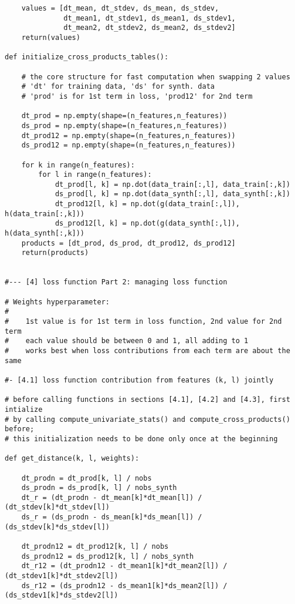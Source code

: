 \documentclass[oneside,10pt]{book}
\begin{document}
\begin{lstlisting}
    values = [dt_mean, dt_stdev, ds_mean, ds_stdev,
              dt_mean1, dt_stdev1, ds_mean1, ds_stdev1,
              dt_mean2, dt_stdev2, ds_mean2, ds_stdev2]
    return(values)

def initialize_cross_products_tables():

    # the core structure for fast computation when swapping 2 values
    # 'dt' for training data, 'ds' for synth. data
    # 'prod' is for 1st term in loss, 'prod12' for 2nd term

    dt_prod = np.empty(shape=(n_features,n_features))
    ds_prod = np.empty(shape=(n_features,n_features))
    dt_prod12 = np.empty(shape=(n_features,n_features))
    ds_prod12 = np.empty(shape=(n_features,n_features))

    for k in range(n_features):
        for l in range(n_features):
            dt_prod[l, k] = np.dot(data_train[:,l], data_train[:,k])
            ds_prod[l, k] = np.dot(data_synth[:,l], data_synth[:,k])
            dt_prod12[l, k] = np.dot(g(data_train[:,l]), h(data_train[:,k]))
            ds_prod12[l, k] = np.dot(g(data_synth[:,l]), h(data_synth[:,k]))
    products = [dt_prod, ds_prod, dt_prod12, ds_prod12]
    return(products)


#--- [4] loss function Part 2: managing loss function

# Weights hyperparameter:
#
#    1st value is for 1st term in loss function, 2nd value for 2nd term
#    each value should be between 0 and 1, all adding to 1
#    works best when loss contributions from each term are about the same

#- [4.1] loss function contribution from features (k, l) jointly

# before calling functions in sections [4.1], [4.2] and [4.3], first intialize
# by calling compute_univariate_stats() and compute_cross_products() before;
# this initialization needs to be done only once at the beginning

def get_distance(k, l, weights):

    dt_prodn = dt_prod[k, l] / nobs
    ds_prodn = ds_prod[k, l] / nobs_synth
    dt_r = (dt_prodn - dt_mean[k]*dt_mean[l]) / (dt_stdev[k]*dt_stdev[l])
    ds_r = (ds_prodn - ds_mean[k]*ds_mean[l]) / (ds_stdev[k]*ds_stdev[l])

    dt_prodn12 = dt_prod12[k, l] / nobs
    ds_prodn12 = ds_prod12[k, l] / nobs_synth
    dt_r12 = (dt_prodn12 - dt_mean1[k]*dt_mean2[l]) / (dt_stdev1[k]*dt_stdev2[l])
    ds_r12 = (ds_prodn12 - ds_mean1[k]*ds_mean2[l]) / (ds_stdev1[k]*ds_stdev2[l])


\end{lstlisting}
\end{document}
